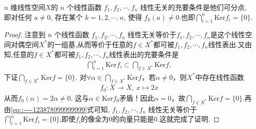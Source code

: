 \documentclass[../../main.tex]{subfiles}%
\begin{document}
\begin{corollary}\label{corollary:对偶空间的基的充要条件}
\( n \) 维线性空间$X$的 \( n \) 个线性函数 \( f_1, f_2, \cdots, f_n \) 线性无关的充要条件是他们可分点, 即对任何 \( a \neq 0 \), 存在某个 \( k = 1, 2, \cdots, n \), 使得 \( f_k(a) \neq 0 \).也即\( \bigcap_{i=1}^n \mathrm{Ker} f_i = \{0\} \).
\end{corollary}
\begin{proof}

注意到 \( n \) 个线性函数 \( f_1, f_2, \cdots, f_n \) 线性无关等价于\( f_1, f_2, \cdots, f_n \)是这个线性空间对偶空间$X^*$的一组基,从而等价于任意的$f\in X^*$都可被\( f_1, f_2, \cdots, f_n \)线性表出.又由知,任意的$f\in X^*$都可被\( f_1, f_2, \cdots, f_n \)线性表出的充要条件是
\begin{align}
\bigcap_{i=1}^n \mathrm{Ker} f_i \subset \bigcap_{f \in X^*} \mathrm{Ker} f,\label{eq::----123878999999999}
\end{align}
下证$\bigcap_{f \in X^*} \mathrm{Ker} f = \{0\}$. 对$\forall \alpha \in \bigcap_{f \in X^*} \mathrm{Ker} f$，若$\alpha \neq 0$，则$X^*$中存在线性函数
\begin{align*}
f_0: X \longrightarrow X,\ x \longmapsto 2x
\end{align*}
从而$f_0(\alpha) = 2\alpha \neq 0$. 这与$\alpha \in \mathrm{Ker} f_0$矛盾！因此$\alpha = 0$，故$\bigcap_{f \in X^*} \mathrm{Ker} f = \{0\}$.再由\eqref{eq::----123878999999999}式可知, \( f_1, f_2, \cdots, f_n \) 线性无关等价于 \( \bigcap_{i=1}^n \mathrm{Ker} f_i = \{0\} \),即使$f_i$的像全为0的向量只能是0.这就完成了证明.

\end{proof}
\end{document}
